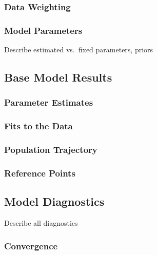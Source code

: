 \documentclass[11pt,
  english,
  letterpaper,
]{article}
\begin{document}
\hypertarget{data-weighting}{%
\subsubsection{Data Weighting}\label{data-weighting}}

\hypertarget{model-parameters}{%
\subsubsection{Model Parameters}\label{model-parameters}}

Describe estimated vs.~fixed parameters, priors

\hypertarget{base-model-results}{%
\subsection{Base Model Results}\label{base-model-results}}

\hypertarget{parameter-estimates}{%
\subsubsection{Parameter Estimates}\label{parameter-estimates}}

\hypertarget{fits-to-the-data}{%
\subsubsection{Fits to the Data}\label{fits-to-the-data}}

\hypertarget{population-trajectory}{%
\subsubsection{Population Trajectory}\label{population-trajectory}}

\hypertarget{reference-points-1}{%
\subsubsection{Reference Points}\label{reference-points-1}}

\hypertarget{model-diagnostics}{%
\subsection{Model Diagnostics}\label{model-diagnostics}}

Describe all diagnostics

\hypertarget{convergence}{%
\subsubsection{Convergence}\label{convergence}}
\end{document}
